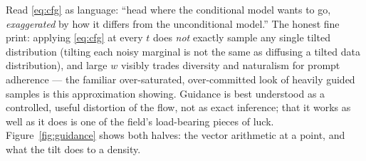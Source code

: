 \documentclass[10pt,a4paper]{article}
\begin{document}
Read \eqref{eq:cfg} as language: ``head where the conditional model wants
to go, \emph{exaggerated} by how it differs from the unconditional
model.'' The honest fine print: applying \eqref{eq:cfg} at every $t$ does
\emph{not} exactly sample any single tilted distribution (tilting each
noisy marginal is not the same as diffusing a tilted data distribution),
and large $w$ visibly trades diversity and naturalism for prompt
adherence --- the familiar over-saturated, over-committed look of heavily
guided samples is this approximation showing. Guidance is best understood
as a controlled, useful distortion of the flow, not as exact inference;
that it works as well as it does is one of the field's load-bearing
pieces of luck. Figure~\ref{fig:guidance} shows both halves: the vector
arithmetic at a point, and what the tilt does to a density.
\end{document}
